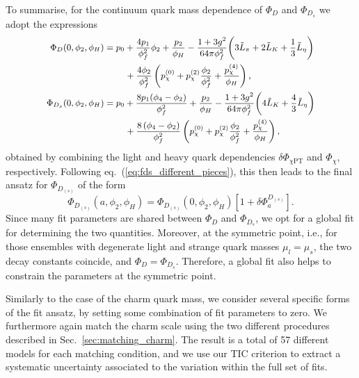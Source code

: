 To summarise, for the continuum quark mass dependence  of $\Phi_D$ and $\Phi_{D_s}$
we adopt the expressions
\begin{equation}\small
	\begin{split}
		\Phi_D(0,\phi_2, \phi_H)  &= p_0 + \frac{4p_1}{\phi_f^2}\phi_2 + \frac{p_2}{\phi_H}
		-\frac{1+3g^2}{64\pi\phi_f^2}\bigg(
		3\tilde{L}_\pi + 2 \tilde{L}_K + \frac{1}{3}\tilde{L}_\eta  
		\bigg)\\
		&\qquad~ 
		+\frac{4  \phi_2 }{\phi_f^2} \left( p_\chi^{(0)} +  p_\chi^{(2)} \frac{\phi_2}{\phi_f^2} + \frac{p_\chi^{(4)}}{\phi_H} \right),
		\\
		\Phi_{D_s}(0,\phi_2, \phi_H)  &= p_0 + \frac{8p_1(\phi_4-\phi_2)}{\phi_f^2} + \frac{p_2}{\phi_H}
		-\frac{1+3g^2}{64\pi\phi_f^2}\bigg(
		4 \tilde{L}_K + \frac{4}{3}\tilde{L}_\eta\bigg)\\
		&\qquad~
	+\frac{8 \left( \phi_4 - \phi_2 \right)} {\phi_f^2} \left( p_\chi^{(0)} +  p_\chi^{(2)} \frac{\phi_2}{\phi_f^2} + \frac{p_\chi^{(4)}}{\phi_H} \right),
	\end{split}
\end{equation}\normalsize
obtained by combining the light and heavy quark dependencies $\delta\Phi_{\chi \mathrm{PT}}$ and $\Phi_\chi$, 
respectively.  
Following eq.~(\ref{eq:fds_different_pieces}), this then leads to the final ansatz for $\Phi_{D_{(s)}}$
of the form
\begin{equation}
	\Phi_{D_{(s)}}(a,\phi_2, \phi_H) = 
	\Phi_{D_{(s)}}(0,\phi_2, \phi_H) \left[ 1   + \delta\Phi_a^{D_{(s)}}\right].
	\label{eq:fds_combined_fit}
\end{equation}
Since many fit parameters are shared between $\Phi_D$ and $\Phi_{D_s}$, we opt for a global fit for 
determining the two quantities. Moreover, at the symmetric point, i.e.,  for those ensembles with 
degenerate light and strange quark masses $\mu_l=\mu_s$, the two decay constants coincide, and
 $\Phi_D=\Phi_{D_s}$. Therefore, a global fit also helps to constrain the parameters at the symmetric 
 point.

Similarly to the case of the charm quark mass, we consider several specific forms of the fit ansatz,
by setting some combination of fit parameters to zero. We furthermore again match the charm scale using
the two different procedures described in Sec.~\ref{sec:matching_charm}. The result is a total
of 57 different models  for each matching condition,
and we use our TIC criterion to extract a systematic uncertainty associated to the variation
within the full set of fits.

